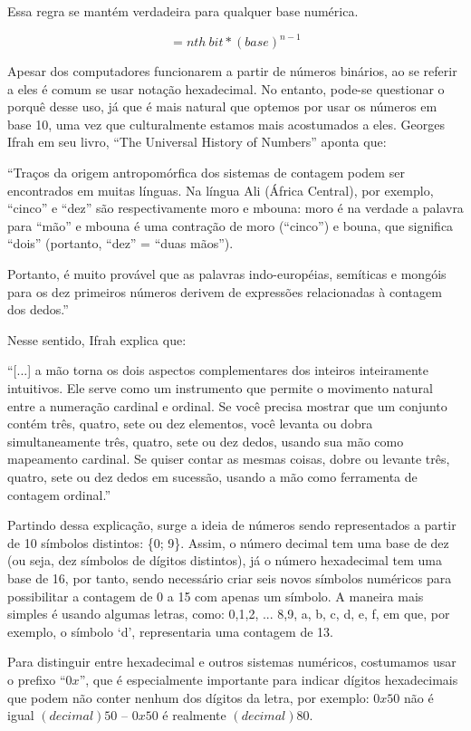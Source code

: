 Essa regra se mantém verdadeira para qualquer base numérica.

\[= nth\: bit * (base)^{n-1}\]






Apesar dos computadores funcionarem a partir de números binários, ao se referir a eles é comum se usar notação hexadecimal. No entanto, pode-se questionar o porquê desse uso, já que é mais natural que optemos por usar os números em base 10, uma vez que culturalmente estamos mais acostumados a eles. Georges Ifrah em seu livro, ``The Universal History of Numbers'' \cite{14} aponta que:

``Traços da origem antropomórfica dos sistemas de contagem podem ser encontrados em muitas línguas. Na língua Ali (África Central), por exemplo, ``cinco'' e ``dez'' são respectivamente moro e mbouna: moro é na verdade a palavra para ``mão'' e mbouna é uma contração de moro (``cinco'') e bouna, que significa ``dois'' (portanto, ``dez'' = ``duas mãos'').

Portanto, é muito provável que as palavras indo-européias, semíticas e mongóis para os dez primeiros números derivem de expressões relacionadas à contagem dos dedos.''

Nesse sentido, Ifrah explica que:

``[...] a mão torna os dois aspectos complementares dos inteiros inteiramente intuitivos. Ele serve como um instrumento que permite o movimento natural entre a numeração cardinal e ordinal. Se você precisa mostrar que um conjunto contém três, quatro, sete ou dez elementos, você levanta ou dobra simultaneamente três, quatro, sete ou dez dedos, usando sua mão como mapeamento cardinal. Se quiser contar as mesmas coisas, dobre ou levante três, quatro, sete ou dez dedos em sucessão, usando a mão como ferramenta de contagem ordinal.''

Partindo dessa explicação, surge a ideia de números sendo representados a partir de 10 símbolos distintos: \{0; 9\}. Assim, o número decimal tem uma base de dez (ou seja, dez símbolos de dígitos distintos), já o número hexadecimal tem uma base de 16, por tanto, sendo necessário criar seis novos símbolos numéricos para possibilitar a contagem de 0 a 15 com apenas um símbolo. A maneira mais simples é usando algumas letras, como: 0,1,2, ... 8,9, a, b, c, d, e, f, em que, por exemplo, o símbolo `d', representaria uma contagem de 13.

Para distinguir entre hexadecimal e outros sistemas numéricos, costumamos usar o prefixo ``$0x$'', que é especialmente importante para indicar dígitos hexadecimais que podem não conter nenhum dos dígitos da letra, por exemplo: $0x50$ não é igual $(decimal) 50$ – $0x50$ é realmente $(decimal) 80$.

